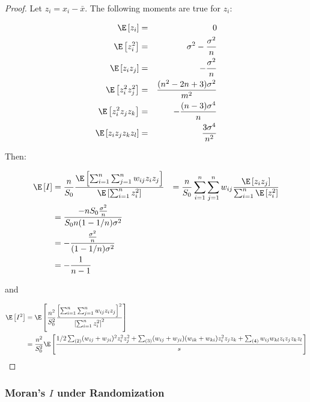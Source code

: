 \begin{proof}
Let $z_i=x_i - \bar{x}$. The following moments are true for $z_i$:

\begin{eqnarray*}
\E\left[z_i\right]   & = & 0 \\
\E\left[z_i^2\right] & = & \sigma^2 - \frac{\sigma^2}{n} \\
\E\left[z_iz_j\right] & = & - \frac{\sigma^2}{n} \\
\E\left[z_i^2 z_j^2\right] & = & \frac{(n^2 - 2n + 3)\sigma^2}{m^2} \\
\E\left[z_i^2 z_jz_k\right] & = & - \frac{(n -3)\sigma^4}{n} \\
\E\left[z_iz_jz_kz_l\right] & = & \frac{3 \sigma^4}{n^2}
\end{eqnarray*}


Then:

\begin{equation}
  \begin{aligned}
    \E\left[I\right] & = \frac{n}{S_0}\frac{\E\left[\sum_{i = 1}^n\sum_{j=1}^nw_{ij}z_iz_j\right]}{\E\left[\sum_{i=1}^nz_i^2\right]}
    & = \frac{n}{S_0}\sum_{i = 1}^n\sum_{j=1}^nw_{ij}\frac{\E\left[z_iz_j\right]}{\sum_{i=1}^n\E\left[z_i^2\right]} \\
    & = \frac{-nS_0\frac{\sigma^2}{n}}{S_0 n (1 - 1/n)\sigma^2 } \\
    & = -\frac{\frac{\sigma^2}{n}}{(1 - 1/n)\sigma^2 } \\
    & = -\frac{1}{n - 1} 
  \end{aligned}
\end{equation}

and

\begin{equation}
  \begin{aligned}
    \E\left[I^2\right] & = \E\left[\frac{n^2}{S_0^2}\frac{\left[\sum_{i = 1}^n\sum_{j=1}^nw_{ij}z_iz_j\right]^2}{\left[\sum_{i=1}^nz_i^2\right]^2}\right] \\
    & = \frac{n^2}{S_0^2} \E\left[\frac{1/2\sum_{(2)}(w_{ij} + w_{ji})^2 z_i^2 z_j^2 + \sum_{(3)}(w_{ij} + w_{ji})(w_{ik} + w_{ki})z_i^2z_jz_k + \sum_{(4)} w_{ij}w_{kl}z_iz_jz_kz_l}{s}\right]
  \end{aligned}
\end{equation}
\end{proof}

\subsubsection{Moran's $I$ under Randomization}

